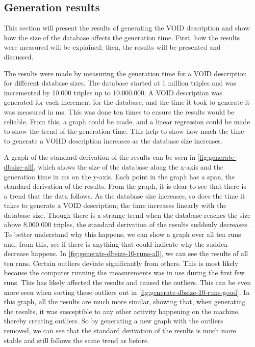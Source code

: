 \subsection{Generation results}\label{subsec:generation-results}
This section will present the results of generating the VOID description and show how the size of the database affects the generation time. First, how the results were measured will be explained; then, the results will be presented and discussed.

The results were made by measuring the generation time for a VOID description for different database sizes. The database started at 1 million triples and was incremented by 10.000 triples up to 10.000.000. A VOID description was generated for each increment for the database, and the time it took to generate it was measured in ms. This was done ten times to ensure the results would be reliable. From this, a graph could be made, and a linear regression could be made to show the trend of the generation time. This help to show how much the time to generate a VOIID description increases as the database size increases.

A graph of the standard derivation of the results can be seen in \autoref{fig:generate-dbsize-all}, which shows the size of the database along the x-axis and the generation time in ms on the y-axis. Each point in the graph has a span, the standard derivation of the results. From the graph, it is clear to see that there is a trend that the data follows. As the database size increases, so does the time it takes to generate a VOID description; the time increases linearly with the database size. Though there is a strange trend when the database reaches the size above 8.000.000 triples, the standard derivation of the results suddenly decreases. To better understand why this happens, we can show a graph over all ten runs and, from this, see if there is anything that could indicate why the sudden decrease happens. In \autoref{fig:generate-dbsize-10-runs-all}, we can see the results of all ten runs. Certain outliers deviate significantly from others. This is most likely because the computer running the measurements was in use during the first few runs. This has likely affected the results and caused the outliers. This can be even more seen when sorting these outliers out in \autoref{fig:generate-dbsize-10-runs-good}. In this graph, all the results are much more similar, showing that, when generating the results, it was susceptible to any other activity happening on the machine, thereby creating outliers. So by generating a new graph with the outliers removed, we can see that the standard derivation of the results is much more stable and still follows the same trend as before.

